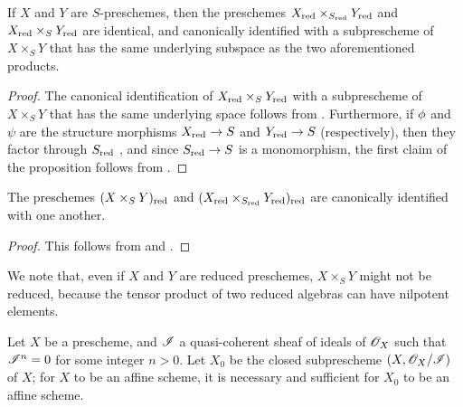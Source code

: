 \begin{proposition}[5.1.7]
\label{I.5.1.7}
If $X$ and $Y$ are $S$-preschemes, then the preschemes $X_{\mathrm{red}}\times_{S_{\mathrm{red}}}Y_{\mathrm{red}}$ and $X_{\mathrm{red}}\times_S Y_{\mathrm{red}}$ are identical, and canonically identified with a subprescheme of $X\times_S Y$ that has the same underlying subspace as the two aforementioned products.
\end{proposition}

\begin{proof}
The canonical identification of $X_{\mathrm{red}}\times_S Y_{\mathrm{red}}$ with a subprescheme of $X\times_S Y$ that has the same underlying space follows from .
Furthermore, if $\phi$ and $\psi$ are the structure morphisms $X_\red\to S$ and $Y_\red\to S$ (respectively), then they factor through $S_{\mathrm{red}}$ , and since $S_\red\to S$ is a monomorphism, the first claim of the proposition follows from .
\end{proof}

\begin{corollary}[5.1.8]
\label{I.5.1.8}
The preschemes $(X\times_S Y)_{\mathrm{red}}$ and $(X_{\mathrm{red}}\times_{S_{\mathrm{red}}}Y_{\mathrm{red}})_{\mathrm{red}}$ are canonically identified with one another.
\end{corollary}

\begin{proof}
This follows from  and .
\end{proof}

We note that, even if $X$ and $Y$ are reduced preschemes, $X\times_S Y$ might not be reduced, because the tensor product of two reduced algebras can have nilpotent elements.

\begin{proposition}[5.1.9]
\label{I.5.1.9}
Let $X$ be a prescheme, and $\mathscr{I}$ a quasi-coherent sheaf of ideals of $\mathscr{O}_X$ such that $\mathscr{I}^n=0$ for some integer $n>0$.
Let $X_0$ be the closed subprescheme $(X,\mathscr{O}_X/\mathscr{I})$ of $X$;
for $X$ to be an affine scheme, it is necessary and sufficient for $X_0$ to be an affine scheme.
\end{proposition}

